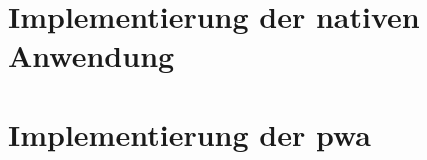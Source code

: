 \section{Implementierung der nativen Anwendung} \label{sec:5-ios}


\section{Implementierung der \acs{pwa}} \label{sec:5-pwa}

